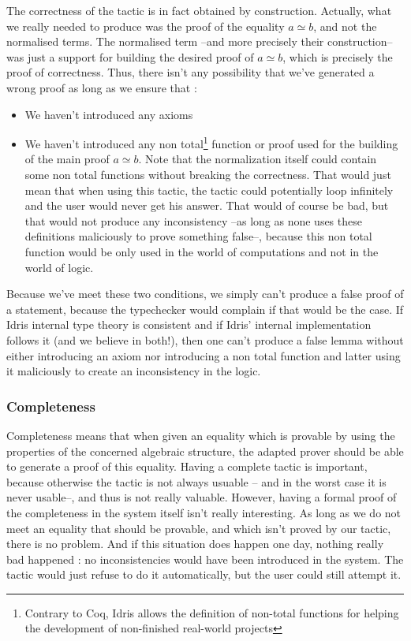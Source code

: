 The correctness of the tactic is in fact obtained by construction. Actually, what we really needed to produce was the proof of the equality $a \simeq b$, and not the normalised terms. The normalised term --and more precisely their construction-- was just a support for building the desired proof of $a \simeq b$, which is precisely the proof of correctness. Thus, there isn't any possibility that we've generated a wrong proof as long as we ensure that :
\begin{itemize}
\item We haven't introduced any axioms
\item We haven't introduced any non total\footnote{Contrary to Coq, Idris allows the definition of non-total functions for helping the development of non-finished real-world projects} function or proof used for the building of the main proof $a \simeq b$. Note that the normalization itself could contain some non total functions without breaking the correctness. That would just mean that when using this tactic, the tactic could potentially loop infinitely and the user would never get his answer. That would of course be bad, but that would not produce any inconsistency --as long as none uses these definitions maliciously to prove something false--, because this non total function would be only used in the world of computations and not in the world of logic.
\end{itemize}

Because we've meet these two conditions, we simply can't produce a false proof of a statement, because the typechecker would complain if that would be the case. If Idris internal type theory is consistent and if Idris' internal implementation follows it (and we believe in both!), then one can't produce a false lemma without either introducing an axiom nor introducing a non total function and latter using it maliciously to create an inconsistency in the logic.

		
		\subsubsection{Completeness}
		
Completeness means that when given an equality which is provable by using the properties of the concerned algebraic structure, the adapted prover should be able to generate a proof of this equality. Having a complete tactic is important, because otherwise the tactic is not always usuable -- and in the worst case it is never usable--, and thus is not really valuable. However, having a formal proof of the completeness in the system itself isn't really interesting. As long as we do not meet an equality that should be provable, and which isn't proved by our tactic, there is no problem. And if this situation does happen one day, nothing really bad happened : no inconsistencies would have been introduced in the system. The tactic would just refuse to do it automatically, but the user could still attempt it. \\

